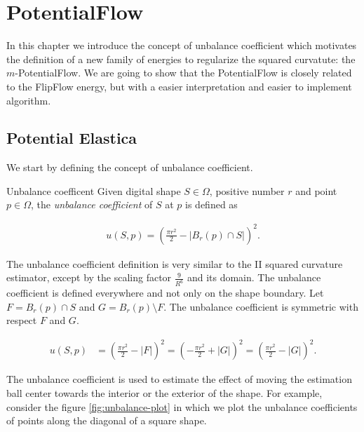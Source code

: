\chapter{PotentialFlow}
\label{chapter:potential-flow}


In this chapter we introduce the concept of unbalance coefficient which motivates the definition of a new family of energies to regularize the squared curvatute: the $m$-PotentialFlow. We are going to show that the PotentialFlow is closely related to the FlipFlow energy, but with a easier interpretation and easier to implement algorithm.


\section{Potential Elastica}
We start by defining the concept of unbalance coefficient.

\begin{definition}{Unbalance coefficent}
Given digital shape $S \in \Omega$, positive number $r$ and point $p \in \Omega$, the \emph{unbalance coefficient} of $S$ at $p$ is defined as

\begin{align*}
	u(S,p) = ( \frac{\pi r^2}{2} - |B_r(p) \cap S| )^2.
\end{align*}

\end{definition}

The unbalance coefficient definition is very similar to the II squared curvature estimator, except by the scaling factor $\frac{9}{R^6}$ and its domain. The unbalance coefficient is defined everywhere and not only on the shape boundary. Let $F=B_r(p) \cap S$ and $G=B_r(p) \setminus F$. The unbalance coefficient is symmetric with respect $F$ and $G$. 

\begin{align*}
	u(S,p) &= ( \frac{\pi r^2}{2} - |F| )^2 = ( -\frac{\pi r^2}{2} + |G| )^2 = ( \frac{\pi r^2}{2} - |G| )^2.
\end{align*}

The unbalance coefficient is used to estimate the effect of moving the estimation ball center towards the interior or the exterior of the shape. For example, consider the figure \ref{fig:unbalance-plot} in which we plot the unbalance coefficients of points along the diagonal of a square shape. 

